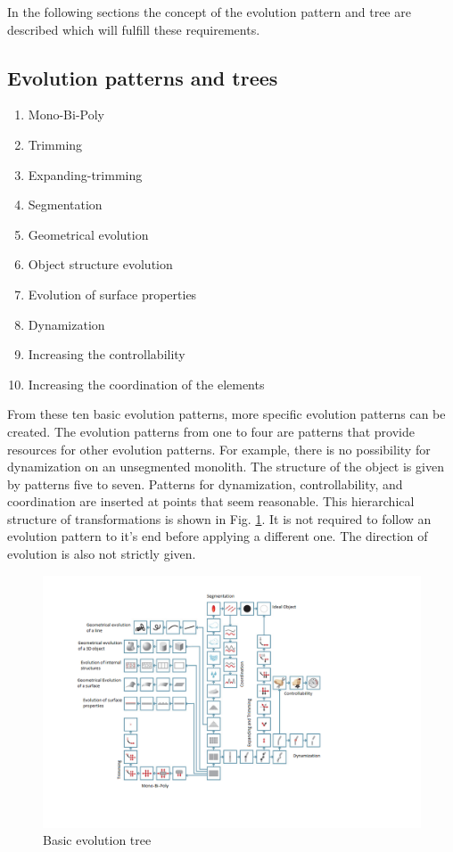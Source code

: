 \documentclass[11pt,a4paper]{article}
\begin{document}
In the following sections the concept of the evolution pattern and tree are described which will fulfill these requirements.

\subsection{Evolution patterns and trees}

\begin{enumerate}
    \item Mono-Bi-Poly
    \item Trimming
    \item Expanding-trimming
    \item Segmentation
    \item Geometrical evolution
    \item Object structure evolution
    \item Evolution of surface properties
    \item Dynamization
    \item Increasing the controllability
    \item Increasing the coordination of the elements
\end{enumerate}

From these ten basic evolution patterns, more specific evolution patterns can be created. The evolution patterns from one to four are patterns that provide resources for other evolution patterns. For example, there is no possibility for dynamization on an unsegmented monolith. The structure of the object is given by patterns five to seven. Patterns for dynamization, controllability, and coordination are inserted at points that seem reasonable. This hierarchical structure of transformations is shown in Fig. \ref{fig:basic_evo}. It is not required to follow an evolution pattern to it's end before applying a different one. The direction of evolution is also not strictly given.

\begin{figure}[htb]
	\centering
	\includegraphics[width=\linewidth]{figures/basictree.png}
	\caption{\small Basic evolution tree \cite{Shpakovsky2016}}
	\label{fig:basic_evo}
\end{figure}
\end{document}
